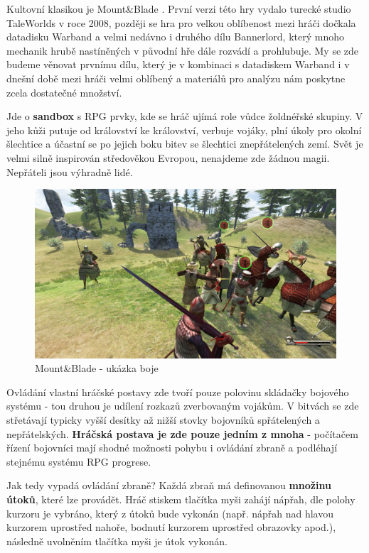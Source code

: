 Kultovní klasikou je Mount\&Blade \cite{MountAndBlade}. První verzi této hry vydalo turecké studio TaleWorlds v roce 2008, později se hra pro velkou oblíbenost mezi hráči dočkala datadisku Warband a velmi nedávno i druhého dílu Bannerlord, který mnoho mechanik hrubě nastíněných v původní hře dále rozvádí a prohlubuje. My se zde budeme věnovat prvnímu dílu, který je v kombinaci s datadiskem Warband i v dnešní době mezi hráči velmi oblíbený a materiálů pro analýzu nám poskytne zcela dostatečné množství.

Jde o \textbf{sandbox} s \acs{RPG} prvky, kde se hráč ujímá role vůdce žoldnéřské skupiny. V jeho kůži putuje od království ke království, verbuje vojáky, plní úkoly pro okolní šlechtice a účastní se po jejich boku bitev se šlechtici znepřátelených zemí. Svět je velmi silně inspirován středověkou Evropou, nenajdeme zde žádnou magii. Nepřáteli jsou výhradně lidé. 

\begin{figure}[ht]\centering
    \center
    \includegraphics[width=140mm]{../img/MountAndBlade-combat.jpg}
    \caption{Mount\&Blade - ukázka boje}
    \label{obr01:mountandblade}
\end{figure} 

Ovládání vlastní hráčské postavy zde tvoří pouze polovinu skládačky bojového systému - tou druhou je udílení rozkazů zverbovaným vojákům. V bitvách se zde střetávají typicky vyšší desítky až nižší stovky bojovníků spřátelených a nepřátelských. \textbf{Hráčská postava je zde pouze jedním z mnoha} - počítačem řízení bojovníci mají shodné možnosti pohybu i ovládání zbraně a podléhají stejnému systému \acs{RPG} progrese. 

Jak tedy vypadá ovládání zbraně? Každá zbraň má definovanou \textbf{množinu útoků}, které lze provádět. Hráč stiskem tlačítka myši zahájí nápřah, dle polohy kurzoru je vybráno, který z útoků bude vykonán (např. nápřah nad hlavou kurzorem uprostřed nahoře, bodnutí kurzorem uprostřed obrazovky apod.), následně uvolněním tlačítka myši je útok vykonán.

